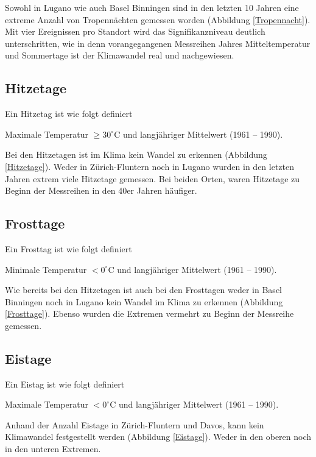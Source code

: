 \begin{refsection}
Sowohl in Lugano wie auch Basel Binningen sind in den letzten 10 Jahren eine extreme Anzahl von Tropennächten gemessen worden (Abbildung \ref{Tropennacht}). Mit vier Ereignissen pro Standort wird das Signifikanzniveau deutlich unterschritten, wie in denn vorangegangenen Messreihen Jahres Mitteltemperatur und Sommertage ist der Klimawandel real und nachgewiesen.


\subsection{Hitzetage}

Ein Hitzetag ist wie folgt definiert

\begin{definition}
Maximale Temperatur $\ge 30^{\circ}$C und langjähriger Mittelwert (1961 -- 1990).
\end{definition}

Bei den Hitzetagen ist im Klima kein Wandel zu erkennen (Abbildung \ref{Hitzetage}). Weder in Zürich-Fluntern noch in Lugano wurden in den letzten Jahren extrem viele Hitzetage gemessen. Bei beiden Orten, waren Hitzetage zu Beginn der Messreihen in den 40er Jahren häufiger.


\subsection{Frosttage}
Ein Frosttag ist wie folgt definiert

\begin{definition}
Minimale Temperatur $< 0^{\circ}$C und langjähriger Mittelwert (1961 -- 1990).
\end{definition}

Wie bereits bei den Hitzetagen ist auch bei den Frosttagen weder in Basel Binningen noch in Lugano kein Wandel im Klima zu erkennen (Abbildung \ref{Frosttage}). Ebenso wurden die Extremen vermehrt zu Beginn der Messreihe gemessen.


\subsection{Eistage}
Ein Eistag ist wie folgt definiert

\begin{definition}
Maximale Temperatur $< 0^{\circ}$C und langjähriger Mittelwert (1961 -- 1990).
\end{definition}

Anhand der Anzahl Eistage in Zürich-Fluntern und Davos, kann kein Klimawandel festgestellt werden (Abbildung \ref{Eistage}). Weder in den oberen noch in den unteren Extremen. 



\end{refsection}
